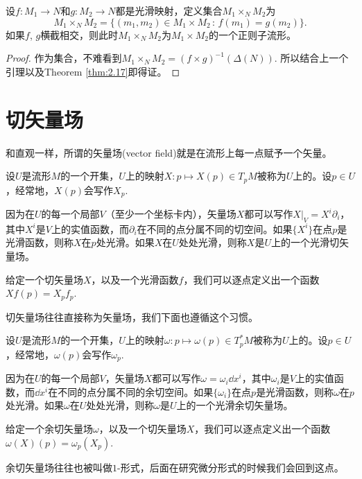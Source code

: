 \begin{pro}\label{pro:2.21}
设$f:M_1\to N$和$g:M_2\to N$都是光滑映射，定义集合$M_1\times_N M_2$为
\[
	M_1\times_N M_2=\{(m_1,m_2)\in M_1\times M_2\,:\, f(m_1)=g(m_2)\}.
\]
如果$f$, $g$横截相交，则此时$M_1\times_N M_2$为$M_1\times M_2$的一个正则子流形。
\end{pro}

\begin{proof}
作为集合，不难看到$M_1\times_N M_2=(f\times g)^{-1}(\Delta(N))$. 所以结合上一个引理以及Theorem \ref{thm:2.17}即得证。
\end{proof}

\section{切矢量场}

和直观一样，所谓的矢量场(vector field)就是在流形上每一点赋予一个矢量。

\begin{para}[切矢量场]
设$U$是流形$M$的一个开集，$U$上的映射$X:p\mapsto X(p)\in T_pM$被称为$U$上的。设$p\in U$，经常地，$X(p)$会写作$X_p$. 

因为在$U$的每一个局部$V$（至少一个坐标卡内），矢量场$X$都可以写作$X|_V=X^i\partial_i$，其中$X^i$是$V$上的实值函数，而$\partial_i$在不同的点分属不同的切空间。如果$\{X^i\}$在点$p$是光滑函数，则称$X$在$p$处光滑。如果$X$在$U$处处光滑，则称$X$是$U$上的一个光滑切矢量场。

给定一个切矢量场$X$，以及一个光滑函数$f$，我们可以逐点定义出一个函数$Xf(p)=X_pf_p$.
\end{para}

切矢量场往往直接称为矢量场，我们下面也遵循这个习惯。

\begin{para}[余切矢量场]
设$U$是流形$M$的一个开集，$U$上的映射$\omega:p\mapsto \omega(p)\in T^*_pM$被称为$U$上的。设$p\in U$，经常地，$\omega(p)$会写作$\omega_p$. 

因为在$U$的每一个局部$V$，矢量场$X$都可以写作$\omega=\omega_i\dd x^i$，其中$\omega_i$是$V$上的实值函数，而$\dd x^i$在不同的点分属不同的余切空间。如果$\{\omega_i\}$在点$p$是光滑函数，则称$\omega$在$p$处光滑。如果$\omega$在$U$处处光滑，则称$\omega$是$U$上的一个光滑余切矢量场。

给定一个余切矢量场$\omega$，以及一个切矢量场$X$，我们可以逐点定义出一个函数$\omega(X)(p)=\omega_p(X_p)$.
\end{para}

余切矢量场往往也被叫做$1$-形式，后面在研究微分形式的时候我们会回到这点。

